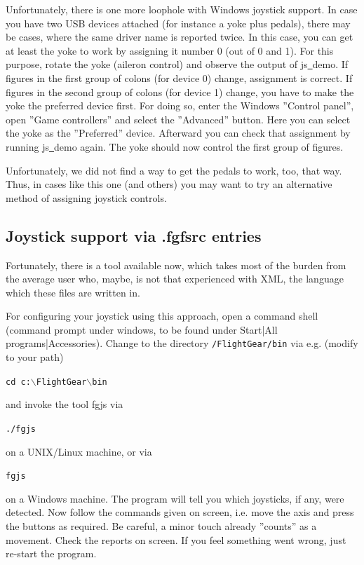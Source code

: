 Unfortunately, there is one more loophole with Windows joystick support. In
case you have two USB devices attached (for instance a yoke plus pedals),
there may be cases, where the same driver name is reported twice. In this
case, you can get at least the yoke to work by assigning it number 0 (out of
0 and 1). For this purpose, rotate the yoke (aileron control) and observe
the output of js\underline{~}demo. If figures in the first group of colons
(for device 0) change, assignment is correct. If figures in the second group
of colons (for device 1) change, you have to make the yoke the preferred
device first. For doing so, enter the
Windows ''Control panel'', open ''Game controllers'' and select the
''Advanced'' button. Here you can select the yoke as the ''Preferred''
device. Afterward you can check that assignment by running
js\underline{~}demo again. The yoke should now control the first group of
figures.

Unfortunately, we did not find a way to get the pedals to work, too, that way. Thus, in cases like this one (and others) you may want to try an alternative method of assigning joystick controls.


\subsection{Joystick support via .fgfsrc entries\label{fgfsrcjoy}}
Fortunately, there is a tool available now, which takes most of the burden from the average user who, maybe, is not that experienced with XML, the language which these files are written in.

For configuring your joystick using this approach, open a command shell (command prompt under windows, to be found under Start|All programs|Accessories). Change to the directory \texttt{/FlightGear/bin} via e.g. (modify to your path) 

\noindent
\texttt{cd c:$\backslash$FlightGear$\backslash$bin}

and invoke the tool fgjs via

\noindent
\texttt{./fgjs}

on a UNIX/Linux machine, or via

\noindent
\texttt{fgjs}

on a Windows machine. The program will tell you which joysticks, if any, were detected. Now follow the commands given on screen, i.e. move the axis and press the buttons as required. Be careful, a minor touch already ''counts'' as a movement. Check the reports on screen. If you feel something went wrong, just re-start the program.

